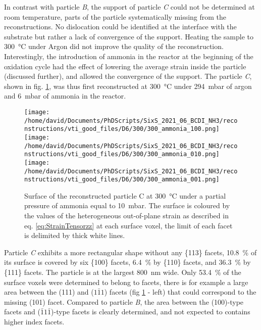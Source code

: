 In contrast with particle \textit{B}, the support of particle \textit{C} could not be determined at room temperature, parts of the particle systematically missing from the reconstructions.
No dislocation could be identified at the interface with the substrate but rather a lack of convergence of the support.
Heating the sample to \qty{300}{\degreeCelsius} under Argon did not improve the quality of the reconstruction.
Interestingly, the introduction of ammonia in the reactor at the beginning of the oxidation cycle had the effect of lowering the average strain inside the particle (discussed further), and allowed the convergence of the support.
The particle \textit{C}, shown in fig. \ref{fig:D6Facets}, was thus first reconstructed at \qty{300}{\degreeCelsius} under \qty{294}{\milli\bar} of argon and \qty{6}{\milli\bar} of ammonia in the reactor.

\begin{figure}[!htb]
    \centering
    \texttt{[image: /home/david/Documents/PhDScripts/SixS\_2021\_06\_BCDI\_NH3/reconstructions/vti\_good\_files/D6/300/300\_ammonia\_100.png]}
    \texttt{[image: /home/david/Documents/PhDScripts/SixS\_2021\_06\_BCDI\_NH3/reconstructions/vti\_good\_files/D6/300/300\_ammonia\_010.png]}
    \texttt{[image: /home/david/Documents/PhDScripts/SixS\_2021\_06\_BCDI\_NH3/reconstructions/vti\_good\_files/D6/300/300\_ammonia\_001.png]}
    \caption{
        Surface of the reconstructed particle C at \qty{300}{\degreeCelsius} under a partial pressure of ammonia equal to \qty{10}{\milli\bar}.
        The surface is coloured by the values of the heterogeneous out-of-plane strain as described in eq. \ref{eq:StrainTensorzz} at each surface voxel, the limit of each facet is delimited by thick white lines.
    }
    \label{fig:D6Facets}
\end{figure}

Particle \textit{C} exhibits a more rectangular shape without any \{113\} facets, \qty{10.8}{\percent} of its surface is covered by six \{100\} facets, \qty{6.4}{\percent} by \{110\} facets, and \qty{36.3}{\percent} by \{111\} facets.
The particle is at the largest \qty{800}{\nm} wide.
Only \qty{53.4}{\percent} of the surface voxels were determined to belong to facets, there is for example a large area between the (111) and ($1\bar{1}1$) facets (fig \ref{fig:D6Facets} - left) that could correspond to the missing (101) facet.
Compared to particle \textit{B}, the area between the (100)-type facets and ($\bar{1}1\bar{1}$)-type facets is clearly determined, and not expected to contains higher index facets.

